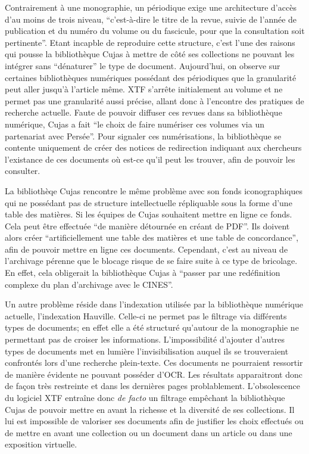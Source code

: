 Contrairement à une monographie, un périodique exige une architecture d'accès d'au moins de trois niveau, \enquote{c'est-à-dire le titre de la revue, suivie de l'année de publication et du numéro du volume ou du fascicule, pour que la consultation soit pertinente}. Etant incapble de reproduire cette structure, c'est l'une des raisons qui pousse la bibliothèque Cujas à mettre de côté ses collections ne pouvant les intégrer sans \enquote{dénaturer} le type de document. Aujourd'hui, on observe sur certaines bibliothèques numériques possédant des périodiques que la granularité peut aller jusqu'à l'article même. XTF s'arrête initialement au volume et ne permet pas une granularité aussi précise, allant donc à l'encontre des pratiques de recherche actuelle. Faute de pouvoir diffuser ces revues dans sa bibliothèque numérique, Cujas a fait \enquote{le choix de faire numériser ces volumes via un partenariat avec Persée}. Pour signaler ces numérisations, la bibliothèque se contente uniquement de créer des notices de redirection indiquant aux chercheurs l'existance de ces documents où est-ce qu'il peut les trouver, afin de pouvoir les consulter. 

La bibliothèqe Cujas rencontre le même problème avec son fonds iconographiques qui ne possédant pas de structure intellectuelle répliquable sous la forme d'une table des matières. Si les équipes de Cujas souhaitent mettre en ligne ce fonds. Cela peut être effectuée \enquote{de manière détournée en créant de PDF}. Ils doivent alors créer \enquote{artificiellement une table des matières et une table de concordance}, afin de pouvoir mettre en ligne ces documents. Cependant, c'est au niveau de l'archivage pérenne que le blocage risque de se faire suite à ce type de bricolage. En effet, cela obligerait la bibliothèque Cujas à \enquote{passer par une redéfinition complexe du plan d'archivage avec le CINES}. 

Un autre problème réside dans l'indexation utilisée par la bibliothèque numérique actuelle, l'indexation Hauville. Celle-ci ne permet pas le filtrage via différents types de documents; en effet elle a été structuré qu'autour de la monographie ne permettant pas de croiser les informations. L'impossibilité d'ajouter d'autres types de documents met en lumière l'invisibilisation auquel ils se trouveraient confrontés lors d'une recherche plein-texte. Ces documents ne pourraient ressortir de manière évidente ne pouvant posséder d'OCR. Les résultats apparaitront donc de façon très restreinte et dans les dernières pages problablement. L'obsolescence du logiciel XTF entraîne donc \textit{de facto} un filtrage empêchant la bibliothèque Cujas de pouvoir mettre en avant la richesse et la diversité de ses collections. Il lui est impossible de valoriser ses documents afin de justifier les choix effectués ou de mettre en avant une collection ou un document dans un article ou dans une exposition virtuelle. 
\medskip

